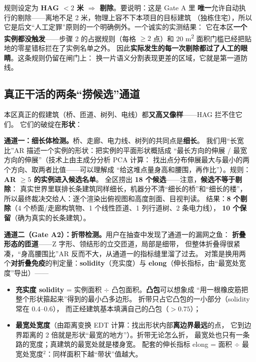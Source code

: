 规则设定为 \textbf{HAG $< 2$ 米 $\Rightarrow$ 剔除}。要说明：这是 Gate A 里
\textbf{唯一}允许自动执行的剔除——离地不足 2 米，物理上容不下本项目的目标建筑
（独栋住宅），所以它是后文``人工定罪''原则的一个明确例外。一个诚实的实测结果：
它在本区\textbf{一个实例都没触发}——步骤 2 的占据规则（每格 $\geq2$ 点）和
20 m\textsuperscript{2} 面积门槛已经把贴地的零星错标拦在了实例名单之外。
因此\textbf{实际发生的每一次剔除都过了人工的眼睛}。这条规则仍留在闸门上：
换一片语义分割表现更差的区域，它就是第一道防线。

\subsection{真正干活的两条``捞候选''通道}

本区真正的假建筑（桥、匝道、树列、电线）都\textbf{又高又像样}——HAG 拦不住它们。
它们的破绽在\textbf{形状}：

\textbf{通道一：细长体检测。}桥、走廊、电力线、树列的共同点是\textbf{细长}。
我们用``长宽比''AR 描述一个实例的形状：把实例的平面形状概括成
``最长方向的伸展 / 最宽方向的伸展''（技术上由主成分分析 PCA 计算：
找出点分布伸展最大与最小的两个方向、取两者比值——可以理解成
``给这堆点量身高和腰围，再作比''）。规则：\textbf{AR $\geq 5$ 的实例进入候选名单}。
全区捞出 \textbf{18 个候选}——注意，\textbf{候选不等于剔除}：
真实世界里联排长条建筑同样细长，机器分不清``细长的桥''和``细长的楼''，
所以最终裁决交给人：逐个渲染出俯视图和高度剖面、目视判读。
结果：\textbf{8 个剔除}（4 个桥面/走廊构筑物、1 个线性匝道、1 列行道树、2 条电力线），
\textbf{10 个保留}（确为真实的长条建筑）。

\textbf{通道二（Gate A2）：折带检测。}用户在抽查中发现了通道一的漏网之鱼：
\textbf{折叠形态的匝道}——Z 字形、领结形的立交匝道，局部是细带，
但整体折叠得很紧凑，``身高腰围比''AR 反而不大，从通道一的指标缝里溜了过去。
对策是换用两个\textbf{对折叠免疫}的判定量：\textbf{solidity}（充实度）与
\textbf{elong}（伸长指标，由``最宽处宽度''导出）——

\begin{itemize}
\item \textbf{充实度 solidity} = 实例面积 $\div$ 凸包面积。\textbf{凸包}可以想象成
      ``用一根橡皮筋把整个形状箍起来''得到的最小凸多边形。
      折带只占它凸包的一小部分（solidity 常在 0.4--0.6），
      而正经建筑基本填满自己的凸包（$>0.75$）；
\item \textbf{最宽处宽度}（由距离变换 EDT 计算：找出形状内部\textbf{离边界最远}的点，
      它到边界距离的 2 倍就是形状``最宽的地方''）。折带无论怎么折，
      最宽处也只有一条路的宽度；真建筑的最宽处就是楼身宽。
      配套的伸长指标 elong = 面积 $\div$ 最宽处宽度$^2$：同样面积下越``带状''值越大。
\end{itemize}

